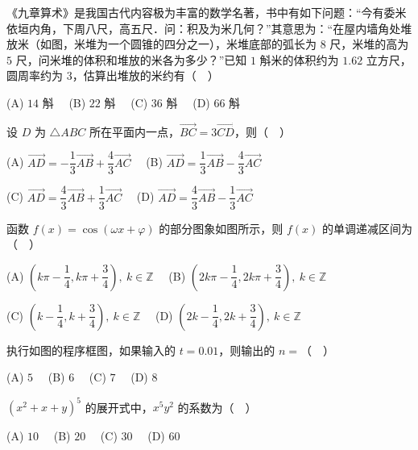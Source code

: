 \begin{question}
《九章算术》是我国古代内容极为丰富的数学名著，书中有如下问题：“今有委米依垣内角，下周八尺，高五尺．问：积及为米几何？”其意思为：“在屋内墙角处堆放米（如图，米堆为一个圆锥的四分之一），米堆底部的弧长为 $8$ 尺，米堆的高为 $5$ 尺，问米堆的体积和堆放的米各为多少？”已知 $1$ 斛米的体积约为 $1.62$ 立方尺，圆周率约为 $3$，估算出堆放的米约有（　）
\nopagebreak[4]
\begin{center}\end{center}
\nopagebreak[4]
(A) $14$ 斛　 (B) $22$ 斛　 (C) $36$ 斛　 (D) $66$ 斛

\end{question}
\begin{question}
设 $D$ 为 $\triangle ABC$ 所在平面内一点，$\overrightarrow{BC}=3\overrightarrow{CD}$，则（　）

(A) $\overrightarrow{AD}=-\dfrac13\overrightarrow{AB}+\dfrac43\overrightarrow{AC}$　 (B) $\overrightarrow{AD}=\dfrac13\overrightarrow{AB}-\dfrac43\overrightarrow{AC}$

(C) $\overrightarrow{AD}=\dfrac43\overrightarrow{AB}+\dfrac13\overrightarrow{AC}$　 (D) $\overrightarrow{AD}=\dfrac43\overrightarrow{AB}-\dfrac13\overrightarrow{AC}$

\Needspace{0.4\textheight}
\end{question}
\begin{question}
函数 $f(x)=\cos(\omega x+\varphi)$ 的部分图象如图所示，则 $f(x)$ 的单调递减区间为（　）
\nopagebreak[4]
\begin{center}\end{center}
\nopagebreak[4]
(A) $\left(k\pi-\dfrac14,k\pi+\dfrac34\right),\ k\in\mathbb Z$　 (B) $\left(2k\pi-\dfrac14,2k\pi+\dfrac34\right),\ k\in\mathbb Z$

(C) $\left(k-\dfrac14,k+\dfrac34\right),\ k\in\mathbb Z$　 (D) $\left(2k-\dfrac14,2k+\dfrac34\right),\ k\in\mathbb Z$

\Needspace{0.4\textheight}
\end{question}
\begin{question}
执行如图的程序框图，如果输入的 $t=0.01$，则输出的 $n=$（　）
\nopagebreak[4]
\begin{center}\end{center}
\nopagebreak[4]
(A) $5$　 (B) $6$　 (C) $7$　 (D) $8$

\end{question}
\begin{question}
$(x^2+x+y)^5$ 的展开式中，$x^5y^2$ 的系数为（　）

(A) $10$　 (B) $20$　 (C) $30$　 (D) $60$

\Needspace{0.4\textheight}
\end{question}
